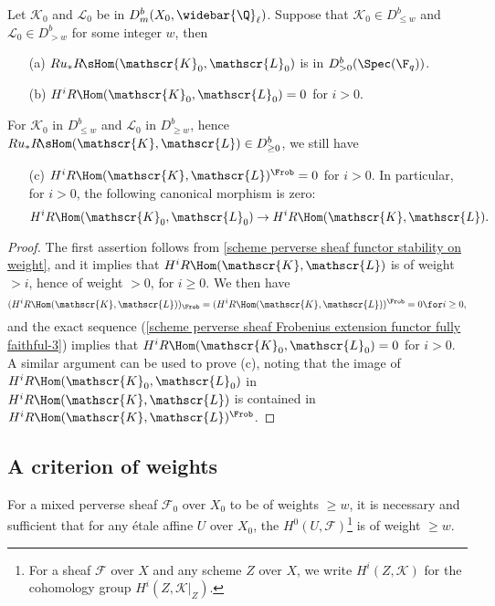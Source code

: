\begin{proposition}\label{scheme mixed complex unequal weight RHom prop}
Let $\mathscr{K}_0$ and $\mathscr{L}_0$ be in $D^b_m(X_0,\widebar{\Q}_\ell)$. Suppose that $\mathscr{K}_0\in D^b_{\leq w}$ and $\mathscr{L}_0\in D^b_{>w}$ for some integer $w$, then
\begin{enumerate}
    \item[(a)] $Ru_*R\!\sHom(\mathscr{K}_0,\mathscr{L}_0)$ is in $D^b_{>0}(\Spec(\F_q))$.
    \item[(b)] $H^iR\Hom(\mathscr{K}_0,\mathscr{L}_0)=0$ for $i>0$.
\end{enumerate}
For $\mathscr{K}_0$ in $D^b_{\leq w}$ and $\mathscr{L}_0$ in $D^b_{\geq w}$, hence $Ru_*R\!\sHom(\mathscr{K},\mathscr{L})\in D^b_{\geq 0}$, we still have
\begin{enumerate}
    \item[(c)] $H^iR\Hom(\mathscr{K},\mathscr{L})^{\Frob}=0$ for $i>0$. In particular, for $i>0$, the following canonical morphism is zero:
    \[H^iR\Hom(\mathscr{K}_0,\mathscr{L}_0)\to H^iR\Hom(\mathscr{K},\mathscr{L}).\]
\end{enumerate} 
\end{proposition}
\begin{proof}
The first assertion follows from \cref{scheme perverse sheaf functor stability on weight}, and it implies that $H^iR\Hom(\mathscr{K},\mathscr{L})$ is of weight $>i$, hence of weight $>0$, for $i\geq 0$. We then have
\[(H^iR\Hom(\mathscr{K},\mathscr{L}))_\Frob=(H^iR\Hom(\mathscr{K},\mathscr{L}))^\Frob=0 \for i\geq 0,\]
and the exact sequence (\ref{scheme perverse sheaf Frobenius extension functor fully faithful-3}) implies that $H^iR\Hom(\mathscr{K}_0,\mathscr{L}_0)=0$ for $i>0$. A similar argument can be used to prove (c), noting that the image of $H^iR\Hom(\mathscr{K}_0,\mathscr{L}_0)$ in $H^iR\Hom(\mathscr{K},\mathscr{L})$ is contained in $H^iR\Hom(\mathscr{K},\mathscr{L})^{\Frob}$.
\end{proof}

\subsection{A criterion of weights}
\begin{theorem}\label{scheme mixed perverse sheaf weight char}
For a mixed perverse sheaf $\mathscr{F}_0$ over $X_0$ to be of weights $\geq w$, it is necessary and sufficient that for any \'etale affine $U$ over $X_0$, the $H^0(U,\mathscr{F})$\footnote{For a sheaf $\mathscr{F}$ over $X$ and any scheme $Z$ over $X$, we write $H^i(Z,\mathscr{K})$ for the cohomology group $H^i(Z,\mathscr{K}|_Z)$.} is of weight $\geq w$.
\end{theorem}


